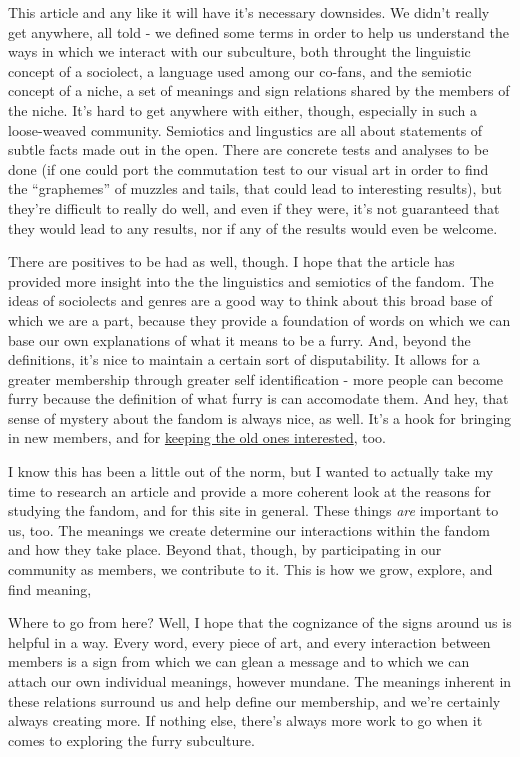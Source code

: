This article and any like it will have it's necessary downsides. We
didn't really get anywhere, all told - we defined some terms in order to
help us understand the ways in which we interact with our subculture,
both throught the linguistic concept of a sociolect, a language used
among our co-fans, and the semiotic concept of a niche, a set of
meanings and sign relations shared by the members of the niche. It's
hard to get anywhere with either, though, especially in such a
loose-weaved community. Semiotics and lingustics are all about
statements of subtle facts made out in the open. There are concrete
tests and analyses to be done (if one could port the commutation test to
our visual art in order to find the ``graphemes'' of muzzles and tails,
that could lead to interesting results), but they're difficult to really
do well, and even if they were, it's not guaranteed that they would lead
to any results, nor if any of the results would even be welcome.

There are positives to be had as well, though. I hope that the article
has provided more insight into the the linguistics and semiotics of the
fandom. The ideas of sociolects and genres are a good way to think about
this broad base of which we are a part, because they provide a
foundation of words on which we can base our own explanations of what it
means to be a furry. And, beyond the definitions, it's nice to maintain
a certain sort of disputability. It allows for a greater membership
through greater self identification - more people can become furry
because the definition of what furry is can accomodate them. And hey,
that sense of mystery about the fandom is always nice, as well. It's a
hook for bringing in new members, and for
\href{http://adjectivespecies.com/2012/03/21/makyos-kaddish/}{keeping
the old ones interested}, too.

I know this has been a little out of the norm, but I wanted to actually
take my time to research an article and provide a more coherent look at
the reasons for studying the fandom, and for this site in general. These
things \emph{are} important to us, too. The meanings we create determine
our interactions within the fandom and how they take place. Beyond that,
though, by participating in our community as members, we contribute to
it. This is how we grow, explore, and find meaning,

Where to go from here? Well, I hope that the cognizance of the signs
around us is helpful in a way. Every word, every piece of art, and every
interaction between members is a sign from which we can glean a message
and to which we can attach our own individual meanings, however mundane.
The meanings inherent in these relations surround us and help define our
membership, and we're certainly always creating more. If nothing else,
there's always more work to go when it comes to exploring the furry
subculture.

